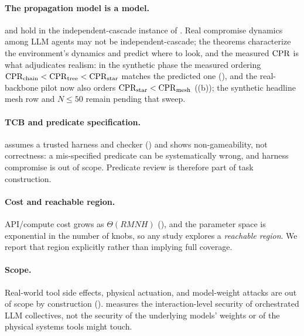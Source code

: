 \paragraph{The propagation model is a model.} 
and  hold in the independent-cascade instance of . Real
compromise dynamics among LLM agents may not be independent-cascade; the theorems characterize
the environment's dynamics and predict where to look, and the measured $\mathrm{CPR}$ is what
adjudicates realism: in the synthetic phase the measured ordering
$\mathrm{CPR}_{\mathrm{chain}}<\mathrm{CPR}_{\mathrm{tree}}<\mathrm{CPR}_{\mathrm{star}}$ matches the predicted
one (), and the real-backbone pilot now also orders
$\mathrm{CPR}_{\mathrm{star}}<\mathrm{CPR}_{\mathrm{mesh}}$ ((b)); the synthetic
headline mesh row and $N\le50$ remain pending that sweep.

\paragraph{TCB and predicate specification.}  assumes a trusted harness
and checker () and shows non-gameability, not correctness: a mis-specified
predicate can be systematically wrong, and harness compromise is out of scope. Predicate
review is therefore part of task construction.

\paragraph{Cost and reachable region.} API/compute cost grows as $\Theta(RMNH)$
(), and the parameter space is exponential in the number of knobs, so
any study explores a \emph{reachable region}. We report that region explicitly rather than
implying full coverage.

\paragraph{Scope.} Real-world tool side effects, physical actuation, and model-weight
attacks are out of scope by construction ().  measures the
interaction-level security of orchestrated LLM collectives, not the security of the
underlying models' weights or of the physical systems tools might touch.
